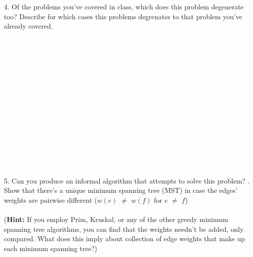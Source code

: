 \documentclass[12pt]{article}
\begin{document}
4. Of the problems you've covered in class, which does this problem degenerate too? Describe for 
which cases this problems degrenates to that problem you've already covered.\\\\\\\\\\\\\\\\\\\\\\\\\\\\\\\\
5. Can you produce an informal algorithm that attempts to solve this problem?
\newpage
{}. Show that there's a unique minimum spanning tree (MST) in case the edges' weights are pairwise different ($w(e)$ $\neq$ $w(f)$ for $e$ $\neq$ $f$)\\\\
(\textbf{Hint: }If you employ Prim, Kruskal, or any of the other greedy minimum spanning tree algorithms, you can find that the weights needn't be added, only compared. 
What does this imply about collection of edge weights that make up each minimum spanning tree?)
\end{document}

